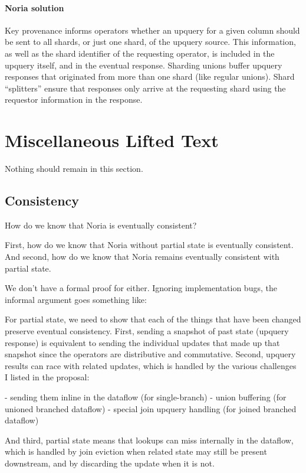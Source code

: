 \paragraph{Noria solution}
Key provenance informs operators whether an upquery for a given column should be
sent to all shards, or just one shard, of the upquery source. This information,
as well as the shard identifier of the requesting operator, is included in the
upquery itself, and in the eventual response. Sharding unions buffer upquery
responses that originated from more than one shard (like regular unions). Shard
``splitters'' ensure that responses only arrive at the requesting shard using
the requestor information in the response.

\section{Miscellaneous Lifted Text}

\begin{inprogress}
  Nothing should remain in this section.
\end{inprogress}

\subsection{Consistency}

How do we know that Noria is eventually consistent?

First, how do we know that Noria without partial state is eventually
consistent. And second, how do we know that Noria remains eventually
consistent with partial state.

We don't have a formal proof for either. Ignoring implementation bugs, the
informal argument goes something like:

For partial state, we need to show that each of the things that have been
changed preserve eventual consistency. First, sending a snapshot of past state
(upquery response) is equivalent to sending the individual updates that made
up that snapshot since the operators are distributive and commutative. Second,
upquery results can race with related updates, which is handled by the various
challenges I listed in the proposal:

 - sending them inline in the dataflow (for single-branch)
 - union buffering (for unioned branched dataflow)
 - special join upquery handling (for joined branched dataflow)

And third, partial state means that lookups can miss internally in the
dataflow, which is handled by join eviction when related state may still be
present downstream, and by discarding the update when it is not.
